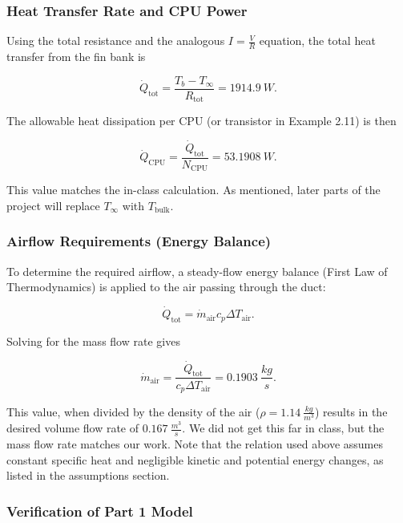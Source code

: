 \documentclass[12pt, titlepage]{article}
\begin{document}
\subsubsection{Heat Transfer Rate and CPU Power}

Using the total resistance and the analogous $I = \tfrac{V}{R}$ equation, the total heat transfer from the fin bank is

\begin{equation}
\dot{Q}_{\text{tot}} = \frac{T_b - T_{\infty}}{R_{\text{tot}}} = 1914.9\ W.
\end{equation}

The allowable heat dissipation per CPU (or transistor in Example 2.11) is then

\begin{equation}
\dot{Q}_{\text{CPU}} = \frac{\dot{Q}_{\text{tot}}}{N_{\text{CPU}}} = 53.1908\ W.
\end{equation}

This value matches the in-class calculation. As mentioned, later parts of the project will replace $T_{\infty}$ with $T_{\text{bulk}}$.

\subsubsection{Airflow Requirements (Energy Balance)}

To determine the required airflow, a steady-flow energy balance (First Law of Thermodynamics) is applied to the air passing through the duct:

\begin{equation}
\dot{Q}_{\text{tot}} = \dot{m}_{\text{air}} c_p \Delta T_{\text{air}}.
\end{equation}

Solving for the mass flow rate gives

\begin{equation}
\dot{m}_{\text{air}} = \frac{\dot{Q}_{\text{tot}}}{c_p \Delta T_{\text{air}}} = 0.1903\ \frac{kg}{s}.
\end{equation}

This value, when divided by the density of the air ($\rho = 1.14\ \tfrac{kg}{m^3}$) results in the desired volume flow rate of $0.167\ \tfrac{m^3}{s}$. We did not get this far in class, but the mass flow rate matches our work. Note that the relation used above assumes constant specific heat and negligible kinetic and potential energy changes, as listed in the assumptions section.


\subsubsection{Verification of Part 1 Model}
\end{document}
